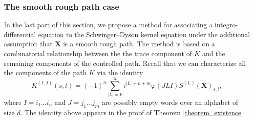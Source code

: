 \documentclass{article}%
\begin{document}

\subsubsection{The smooth rough path case}\label{sec:smooth_RP_SD}

In the last part of this section, we propose a method for associating a integro-differential equation to the Schwinger–Dyson kernel equation under the additional assumption that $\mathbf{X}$ is a smooth rough path.
The method is based on a combinatorial relationship between the   the trace component of $K$ and the remaining components of the controlled path.
Recall that we can characterize all  the components of the path $K$ via the identity
\begin{equation}\label{gub_representation}
K^{(I, J)}
(s, t) = (-1)^n\sum_{|L| = 0}^\infty i^{
|L|+n + m} \varphi(JLI) S^{(L)}
(\mathbf{X})_{s, t},
\end{equation}
where $I = i_1 \dots i_n$ and  $J = j_1 \dots j_m$ are possibly empty words over an alphabet of size $d$.
The identity above appears in the proof of Theorem \ref{theorem_existence}.
 
\end{document}
